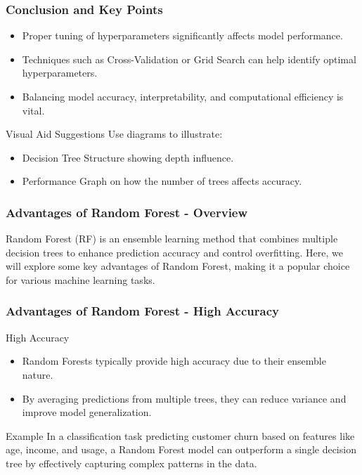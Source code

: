 \documentclass[aspectratio=169]{beamer}
\begin{document}
\begin{frame}[fragile]
    \frametitle{Conclusion and Key Points}
    \begin{itemize}
        \item Proper tuning of hyperparameters significantly affects model performance.
        \item Techniques such as Cross-Validation or Grid Search can help identify optimal hyperparameters.
        \item Balancing model accuracy, interpretability, and computational efficiency is vital.
    \end{itemize}
    \begin{block}{Visual Aid Suggestions}
        Use diagrams to illustrate:
        \begin{itemize}
            \item Decision Tree Structure showing depth influence.
            \item Performance Graph on how the number of trees affects accuracy.
        \end{itemize}
    \end{block}
\end{frame}

\begin{frame}[fragile]
    \frametitle{Advantages of Random Forest - Overview}
    Random Forest (RF) is an ensemble learning method that combines multiple decision trees to enhance prediction accuracy and control overfitting. Here, we will explore some key advantages of Random Forest, making it a popular choice for various machine learning tasks.
\end{frame}

\begin{frame}[fragile]
    \frametitle{Advantages of Random Forest - High Accuracy}
    \begin{block}{High Accuracy}
        \begin{itemize}
            \item Random Forests typically provide high accuracy due to their ensemble nature. 
            \item By averaging predictions from multiple trees, they can reduce variance and improve model generalization.
        \end{itemize}
    \end{block}
    \begin{block}{Example}
        In a classification task predicting customer churn based on features like age, income, and usage, a Random Forest model can outperform a single decision tree by effectively capturing complex patterns in the data.
    \end{block}
\end{frame}
\end{document}
